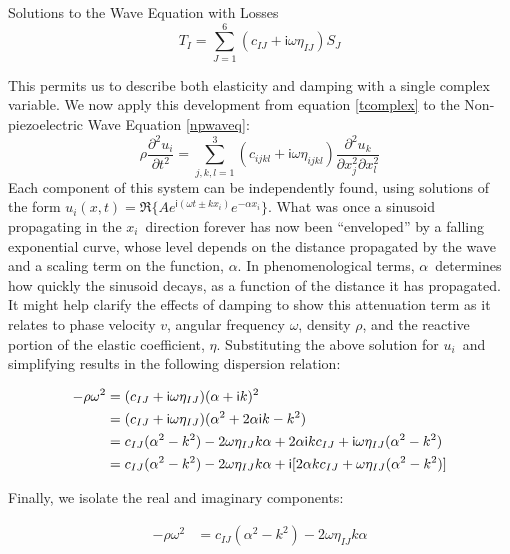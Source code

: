 \documentclass[a4paper,10pt]{report}
\numberwithin{equation}{section}
\begin{document}
{\begin{chapter}
\begin{section}{Solutions to the Wave Equation with Losses}
\begin{equation}
 T_I = \sum_{J=1}^6 (c_{IJ} + \mathsf{i}\omega\eta_{IJ})S_J
\end{equation}
\par
This permits us to describe both elasticity and damping with a single complex variable. We now apply this development from equation \eqref{tcomplex} to the Non-piezoelectric Wave Equation \eqref{npwaveq}:
\begin{equation}
 \rho\frac{\partial^2 u_i}{\partial t^2} = \sum_{j,k,l=1}^3(c_{ijkl} + \mathsf{i}\omega\eta_{ijkl})\frac{\partial^2 u_k}{\partial x_j^2 \partial x_l^2}
\end{equation}
Each component of this system can be independently found, using solutions of the form $u_i(x, t) = \Re\{A e^{\mathsf{i}(\omega t \pm kx_i)}e^{-\alpha x_i}\}$. What was once a sinusoid propagating in the $x_i$\  direction forever has now been ``enveloped'' by a falling exponential curve, whose level depends on the distance propagated by the wave and a scaling term on the function, $\alpha$. In phenomenological terms, $\alpha$\  determines how quickly the sinusoid decays, as a function of the distance it has propagated. It might help clarify the effects of damping to show this attenuation term as it relates to phase velocity $v$, angular frequency $\omega$, density $\rho$, and the reactive portion of the elastic coefficient, $\eta$. Substituting the above solution for $u_i$\  and simplifying results in the following dispersion relation\cite[p.~12]{Nelson1992}\cite[p.~22]{Ballantine1997}:
\begin{singlespace}
\begin{align}
 -\rho\omega^2 &= (c_{IJ}+\mathsf{i}\omega\eta_{IJ})(\alpha + \mathsf{i}k)^2\notag \\
 &= (c_{IJ}+\mathsf{i}\omega\eta_{IJ})(\alpha^2 + 2\alpha\mathsf{i}k - k^2)\\
 &= c_{IJ}(\alpha^2 - k^2) - 2\omega\eta_{IJ}k\alpha + 2\alpha\mathsf{i} k c_{IJ} + \mathsf{i}\omega\eta_{IJ}(\alpha^2 - k^2)\notag \\
 &= c_{IJ}(\alpha^2 - k^2) - 2\omega\eta_{IJ}k\alpha + \mathsf{i}[2\alpha k c_{IJ} + \omega\eta_{IJ}(\alpha^2 - k^2)] \notag
\end{align}
\end{singlespace}
\footnotemark  Finally, we isolate the real and imaginary components:
\begin{singlespace}
 \begin{align}
  -\rho\omega^2 &= c_{IJ}(\alpha^2 - k^2) - 2\omega\eta_{IJ}k\alpha

\end{align}
\end{singlespace}
\end{section}
\end{chapter}}
\end{document}
